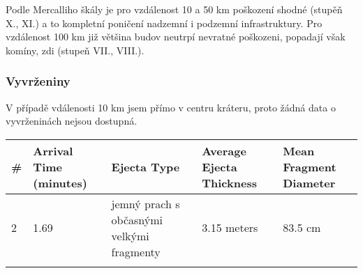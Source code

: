 \documentclass[
]{article}
\begin{document}
Podle Mercalliho škály je pro vzdálenost 10 a 50 km poškození shodné
(stupěň X., XI.) a to kompletní poničení nadzemní i podzemní
infrastruktury. Pro vzdálenost 100 km již většina budov neutrpí nevratné
poškozeni, popadají však komíny, zdi (stupeň VII., VIII.).

\hypertarget{vyvrux17eeniny}{%
\subsubsection{Vyvrženiny}\label{vyvrux17eeniny}}

V případě vdálenosti 10 km jsem přímo v centru kráteru, proto žádná data
o vyvrženinách nejsou dostupná.

\begin{longtable}[]{@{}lllll@{}}
\toprule
\begin{minipage}[b]{0.02\columnwidth}\raggedright
\#\strut
\end{minipage} & \begin{minipage}[b]{0.17\columnwidth}\raggedright
Arrival Time (minutes)\strut
\end{minipage} & \begin{minipage}[b]{0.31\columnwidth}\raggedright
Ejecta Type\strut
\end{minipage} & \begin{minipage}[b]{0.18\columnwidth}\raggedright
Average Ejecta Thickness\strut
\end{minipage} & \begin{minipage}[b]{0.17\columnwidth}\raggedright
Mean Fragment Diameter\strut
\end{minipage}\tabularnewline
\midrule
\endhead
\begin{minipage}[t]{0.02\columnwidth}\raggedright
2\strut
\end{minipage} & \begin{minipage}[t]{0.17\columnwidth}\raggedright
1.69\strut
\end{minipage} & \begin{minipage}[t]{0.31\columnwidth}\raggedright
jemný prach s občasnými velkými fragmenty\strut
\end{minipage} & \begin{minipage}[t]{0.18\columnwidth}\raggedright
3.15 meters\strut
\end{minipage} & \begin{minipage}[t]{0.17\columnwidth}\raggedright
83.5 cm\strut
\end{minipage}\tabularnewline
\begin{minipage}[t]{0.02\columnwidth}\raggedright

\end{minipage}
\end{longtable}
\end{document}
